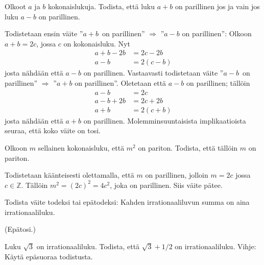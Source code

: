 \begin{tehtavasivu}
\begin{tehtava}
\begin{vastaus}
		\end{vastaus}
	\end{tehtava}

	\begin{tehtava}
		Olkoot $a$ ja $b$ kokonaislukuja. Todista, että luku
		$a + b$ on parillinen jos ja vain jos luku
		$a - b$ on parillinen.
		\begin{vastaus}
		Todistetaan ensin väite ''$a + b$ on parillinen'' $\Rightarrow$ ''$a - b$ on parillinen'': Olkoon $a+b = 2c$, jossa $c$ on kokonaisluku. Nyt
		\begin{align*}
		 a+b-2b &= 2c-2b \\
		 a-b &= 2(c-b) 
		\end{align*}
		josta nähdään että $a-b$ on parillinen. Vastaavasti todistetaan väite ''$a - b$ on parillinen'' $\Rightarrow$ ''$a + b$ on parillinen''. Oletetaan että $a-b$ on parillinen; tällöin
		\begin{align*}
		a - b &= 2c \\
		a-b+2b &= 2c + 2b \\
		a+b &= 2(c+b) 
		\end{align*}
		josta nähdään että $a+b$ on parillinen. Molemminsuuntaisista implikaatioista seuraa, että koko väite on tosi. %

		\end{vastaus}
	\end{tehtava}

	\begin{tehtava}
		Olkoon $m$ sellainen kokonaisluku, että $m^2$ on
		pariton. Todista, että tällöin $m$ on pariton.
		\begin{vastaus}
		Todistetaan käänteisesti olettamalla, että $m$ on parillinen, jolloin $m = 2c$ jossa $c \in \mathbb{Z}$. Tällöin $m^2 = (2c)^2 = 4c^2$, joka on parillinen. Siis väite pätee.
		\end{vastaus}
	\end{tehtava}

	\begin{tehtava}
		Todista väite todeksi tai epätodeksi: Kahden
		irrationaaliluvun summa on aina irrationaaliluku.
		\begin{vastaus}
			(Epätosi.)
		\end{vastaus}
	\end{tehtava}

	\begin{tehtava}
		Luku $\sqrt{3}$ on irrationaaliluku. Todista,
		että $\sqrt{3}+1/2$ on irrationaaliluku. Vihje: Käytä
		epäsuoraa todistusta.
	\end{tehtava}


\end{tehtavasivu}
